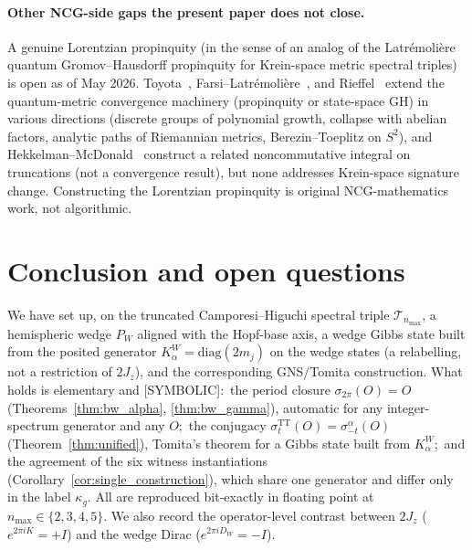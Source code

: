\documentclass[11pt,a4paper]{article}
\theoremstyle{plain}
\theoremstyle{definition}
\newcommand{\nmax}{n_{\max}}
\newcommand{\Tcal}{\mathcal{T}}
\newcommand{\TT}{\mathrm{TT}}
\begin{document}
\paragraph{Other NCG-side gaps the present paper does not close.}
A genuine Lorentzian propinquity (in the sense of an analog of the
Latr\'emoli\`ere quantum Gromov--Hausdorff propinquity for
Krein-space metric spectral triples) is open as of May 2026.
Toyota~\cite{toyota2023}, Farsi--Latr\'emoli\`ere~\cite{farsi_latremoliere2024,
farsi_latremoliere2025}, and Rieffel~\cite{ucp_maps_2024} extend
the quantum-metric convergence machinery (propinquity or state-space GH) in various directions
(discrete groups of polynomial growth, collapse with abelian factors,
analytic paths of Riemannian metrics, Berezin--Toeplitz on $S^2$), and
Hekkelman--McDonald~\cite{hekkelman_mcdonald2024b} construct a related
noncommutative integral on truncations (not a convergence result), but
none addresses
Krein-space signature change. Constructing the Lorentzian propinquity
is original NCG-mathematics work, not algorithmic.

\section{Conclusion and open questions}\label{sec:conclusion}

We have set up, on the truncated Camporesi--Higuchi spectral triple
$\Tcal_{\nmax}$, a hemispheric wedge $P_W$ aligned with the Hopf-base
axis, a wedge Gibbs state built from the posited generator
$K_\alpha^W = \mathrm{diag}(2m_j)$ on the wedge states (a relabelling, not
a restriction of $2J_z$), and the corresponding
GNS/Tomita construction.  What holds is elementary and [SYMBOLIC]:\
the period closure $\sigma_{2\pi}(O) = O$
(Theorems~\ref{thm:bw_alpha}, \ref{thm:bw_gamma}), automatic for any
integer-spectrum generator and any $O$;\ the conjugacy
$\sigma_t^{\TT}(O) = \sigma_{-t}^{\alpha}(O)$
(Theorem~\ref{thm:unified}), Tomita's theorem for a Gibbs state built
from $K_\alpha^W$;\ and the agreement of the six witness
instantiations (Corollary~\ref{cor:single_construction}), which share
one generator and differ only in the label $\kappa_g$.  All are
reproduced bit-exactly in floating point at $\nmax \in \{2, 3, 4, 5\}$.
We also record the operator-level contrast between $2J_z$
($e^{2\pi i K} = +I$) and the wedge Dirac ($e^{2\pi i D_W} = -I$).
\end{document}

